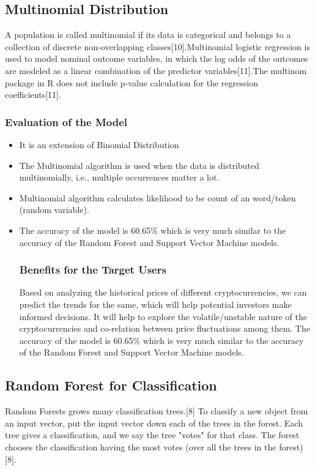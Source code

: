 \documentclass{article}
\begin{document}
\subsection {Multinomial Distribution}
A population is called multinomial if its data is categorical and belongs to a collection of discrete non-overlapping classes[10].Multinomial logistic regression is used to model nominal outcome variables, in which the log odds of the outcomes are modeled as a linear combination of the predictor variables[11].The multinom package in R does not include p-value calculation for the regression coefficients[11].

\subsubsection{Evaluation of the Model}
\begin{itemize}
\item It is an extension of Binomial Distribution
\item The Multinomial algorithm is used when the data is distributed multinomially, i.e., multiple occurrences matter a lot.
\item Multinomial algorithm calculates likelihood to be count of an word/token (random variable). 
\item The accuracy of the model is 60.65\% which is very much similar to the accuracy of the Random Forest and Support Vector Machine models.
\subsubsection{Benefits for the Target Users}
Based on analyzing the historical prices of different cryptocurrencies, we can predict the trends for the same, which will help potential investors make informed decisions. It will help to explore the volatile/unstable nature of the cryptocurrencies and co-relation between price  fluctuations among them. The accuracy of the model is 60.65\% which is very much similar to the accuracy of the Random Forest and Support Vector Machine models.  

\end{itemize}
\subsection {Random Forest for Classification}
Random Forests grows many classification trees.[8] To classify a new object from an input vector, put the input vector down each of the trees in the forest. Each tree gives a classification, and we say the tree "votes" for that class. The forest chooses the classification having the most votes (over all the trees in the forest)[8].
\end{document}
